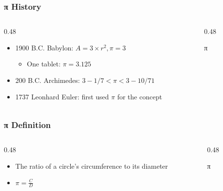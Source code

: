 \begin{frame}
	\frametitle{π History}

    \begin{columns}
        \begin{column}{0.48\linewidth}
            \begin{itemize}[<+- | alert@+>]
                \item 1900 B.C. Babylon: $A=3\times r^2, \pi=3$
                    \begin{itemize}
                        \item One tablet: $\pi=3.125$
                    \end{itemize}
                \item 200 B.C. Archimedes: $3-1/7 < \pi < 3-10/71$
                \item 1737 Leonhard Euler: first used $\pi$ for the concept
            \end{itemize}
        \end{column}
        \begin{column}{0.48\linewidth}
            \centering
            {\Huge π\par}
        \end{column}
    \end{columns}
\end{frame}

\begin{frame}
	\frametitle{π Definition}

    \begin{columns}
        \begin{column}{0.48\linewidth}
            \begin{itemize}[<+- | alert@+>]
                \item The ratio of a circle's circumference to its diameter
                \item $\pi=\frac{C}{D}$
            \end{itemize}
        \end{column}
        \begin{column}{0.48\linewidth}
            \centering
            {\Huge π\par}
        \end{column}
    \end{columns}
\end{frame}

